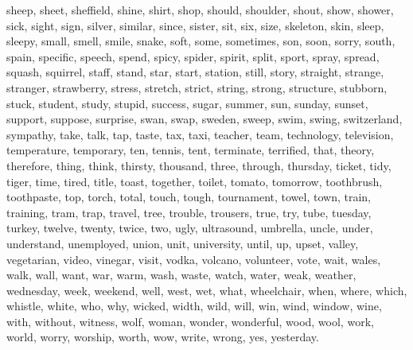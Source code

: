 sheep, sheet, sheffield, shine, shirt, shop, should, shoulder, shout, show, shower, sick, sight, sign, silver, similar, since, sister, sit, six, size, skeleton, skin, sleep, sleepy, small, smell, smile, snake, soft, some, sometimes, son, soon, sorry, south, spain, specific, speech, spend, spicy, spider, spirit, split, sport, spray, spread, squash, squirrel, staff, stand, star, start, station, still, story, straight, strange, stranger, strawberry, stress, stretch, strict, string, strong, structure, stubborn, stuck, student, study, stupid, success, sugar, summer, sun, sunday, sunset, support, suppose, surprise, swan, swap, sweden, sweep, swim, swing, switzerland, sympathy, take, talk, tap, taste, tax, taxi, teacher, team, technology, television, temperature, temporary, ten, tennis, tent, terminate, terrified, that, theory, therefore, thing, think, thirsty, thousand, three, through, thursday, ticket, tidy, tiger, time, tired, title, toast, together, toilet, tomato, tomorrow, toothbrush, toothpaste, top, torch, total, touch, tough, tournament, towel, town, train, training, tram, trap, travel, tree, trouble, trousers, true, try, tube, tuesday, turkey, twelve, twenty, twice, two, ugly, ultrasound, umbrella, uncle, under, understand, unemployed, union, unit, university, until, up, upset, valley, vegetarian, video, vinegar, visit, vodka, volcano, volunteer, vote, wait, wales, walk, wall, want, war, warm, wash, waste, watch, water, weak, weather, wednesday, week, weekend, well, west, wet, what, wheelchair, when, where, which, whistle, white, who, why, wicked, width, wild, will, win, wind, window, wine, with, without, witness, wolf, woman, wonder, wonderful, wood, wool, work, world, worry, worship, worth, wow, write, wrong, yes, yesterday. 